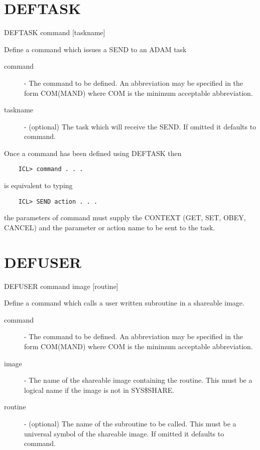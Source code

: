 \section{DEFTASK}

   DEFTASK \hspace{.5cm} command \hspace{.5cm} [taskname]

 Define a command which issues a SEND to an ADAM task

\begin{description}

\item[command] - The command to be defined. An abbreviation
              may be specified in the form COM(MAND) where
              COM is the minimum acceptable abbreviation.

\item[taskname] - (optional) The task which will receive the SEND.
              If omitted it defaults to command.

\end{description}
Once a command has been defined using DEFTASK then
\begin{verbatim}
    ICL> command . . .
\end{verbatim}
is equivalent to typing 
\begin{verbatim}
    ICL> SEND action . . .
\end{verbatim}
the parameters of command must supply the CONTEXT (GET, SET, OBEY, CANCEL)
and the parameter or action name to be sent to the task.


\section{DEFUSER}

   DEFUSER \hspace{.5cm} command \hspace{.5cm} image \hspace{.5cm} [routine]

 Define a command which calls a user written subroutine in a shareable image.

\begin{description}

\item[command] - The command to be defined. An abbreviation
              may be specified in the form COM(MAND) where
              COM is the minimum acceptable abbreviation.         

\item[image] - The name of the shareable image containing the routine.
               This must be a logical name if the image is not in SYS\$SHARE.  

\item[routine] - (optional)  The name of the subroutine to be called. This must
               be a universal symbol of the shareable image. If
              omitted it defaults to command.

\end{description}

